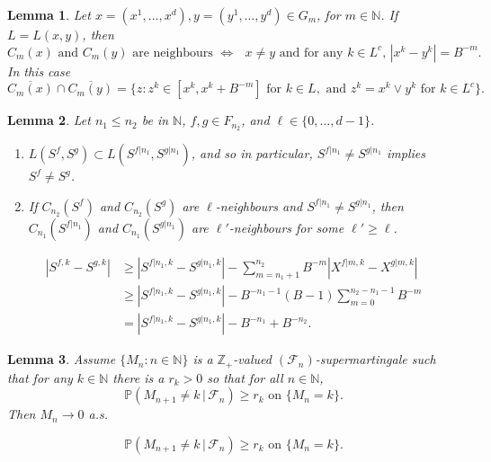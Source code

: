 \documentclass[10pt,a4paper]{amsart}
\newtheorem{lemma}{Lemma}
\newcommand{\N}{\mathbb{N}}
\renewcommand{\P}{\mathbb{P}}
\newcommand{\Z}{\mathbb{Z}}
\newcommand{\cF}{\mathcal F}
\newcommand{\del}[1]{{\color{blue} #1}}
\begin{document}
\begin{lemma}\label{ellneighb} Let $x=(x^1,\dots,x^d), y=(y^1,\dots,y^d)\in G_m$, for $m\in\N$. If $L=L(x,y)$, then
\[\text{$C_m(x)$ and $C_m(y)$ are neighbours $\iff$ $x\neq y$ and for any $k\in L^c$, $|x^k-y^k|=B^{-m}$.}\]
In this case
\begin{equation}\label{Cinters}\overline{C_m(x)}\cap\overline{C_m(y)}=\{z:z^k\in[x^k,x^k+B^{-m}]\text{ for }k\in L,\text{ and }z^k=x^k\vee y^k\text{ for }k\in L^c\}.
\end{equation}
\end{lemma}

\begin{lemma}\label{ellnab}
Let $n_1\le n_2$  be in $\N$, $f,g\in F_{n_2}$, and $\ell\in\{0,\dots,d-1\}$.
\begin{enumerate}[label=\emph{(\alph*)}, ref=(\alph*)]
\item\label{it:L is non-increasing} $L(S^f,S^g)\subset L(S^{f|n_1},S^{g|n_1})$, and so in particular, $S^{f|n_1}\neq S^{g|n_1}$ implies $S^f\neq S^g$.
\item\label{it:neighbours descend from neighbours} If $C_{n_2}(S^f)$ and $C_{n_2}(S^g)$ are $\ell$-neighbours and $S^{f|n_1}\neq S^{g|n_1}$, then $C_{n_1}(S^{f|n_1})$ and $C_{n_1}(S^{g|n_1})$ are $\ell'$-neighbours for some $\ell'\ge \ell$.
\end{enumerate}
\end{lemma}

\begin{align}\label{Sincr}
\nonumber|S^{f,k}-S^{g,k}|&\ge |S^{f|n_1,k}-S^{g|n_1,k}|-\sum_{m=n_1+1}^{n_2}B^{-m}|X^{f|m,k}-X^{g|m,k}|\\
\nonumber&\ge |S^{f|n_1,k}-S^{g|n_1,k}|-B^{-n_1-1}(B-1)\sum_{m=0}^{n_2-n_1-1}B^{-m}\\
&= |S^{f|n_1,k}-S^{g|n_1,k}|-B^{-n_1}+B^{-n_2}.
\end{align}

\begin{lemma}\label{supermart} Assume $\{M_n:n\in\N\}$ is a $\Z_+$-valued $(\cF_n)$-supermartingale such that for any $k\in\N$ there is a $r_k>0$ so that for all $n\in\N$,
\begin{equation}\label{martcond}\P(M_{n+1}\neq k \, | \, \cF_n)\ge r_k\text{ on }\{M_n=k\}.
\end{equation}
Then $M_n\to 0$ a.s.
\end{lemma}

\begin{equation}\P(M_{n+1}\neq k \, | \, \cF_n)\ge r_k\text{ on }\{M_n=k\}.
\end{equation}
\end{document}
